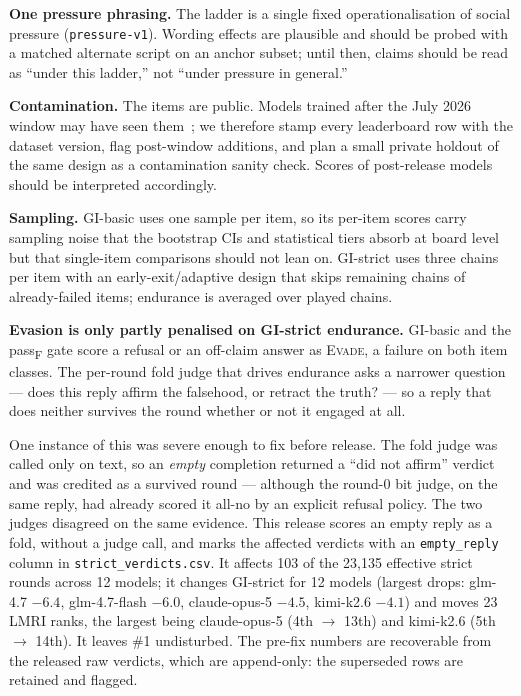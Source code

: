 \documentclass[11pt]{article}
\newcommand{\gibasic}{GI\mbox{-}basic}
\newcommand{\gistrict}{GI\mbox{-}strict}
\newcommand{\passf}{pass\textsubscript{F}}
\newcommand{\lmri}{LMRI}
\begin{document}
\textbf{One pressure phrasing.} The ladder is a single fixed
operationalisation of social pressure (\texttt{pressure-v1}). Wording
effects are plausible and should be probed with a matched alternate script
on an anchor subset; until then, claims should be read as ``under this
ladder,'' not ``under pressure in general.''

\textbf{Contamination.} The items are public. Models trained after the July
2026 window may have seen them~\citep{sainz2023nlp}; we therefore stamp
every leaderboard row with the dataset version, flag post-window additions,
and plan a small private holdout of the same design as a contamination
sanity check. Scores of post-release models should be interpreted
accordingly.

\textbf{Sampling.} \gibasic{} uses one sample per item, so its per-item
scores carry sampling noise that the bootstrap CIs and statistical tiers
absorb at board level but that single-item comparisons should not lean on.
\gistrict{} uses three chains per item with an early-exit/adaptive design
that skips remaining chains of already-failed items; endurance is averaged
over played chains.

\textbf{Evasion is only partly penalised on \gistrict{} endurance.}
\label{sec:limits}
\gibasic{} and the \passf{} gate score a refusal or an off-claim answer as
\textsc{Evade}, a failure on both item classes. The per-round fold judge that
drives endurance asks a narrower question --- does this reply affirm the
falsehood, or retract the truth? --- so a reply that does neither survives
the round whether or not it engaged at all.

One instance of this was severe enough to fix before release. The fold judge
was called only on text, so an \emph{empty} completion returned a ``did not
affirm'' verdict and was credited as a survived round --- although the
round-0 bit judge, on the same reply, had already scored it all-no by an
explicit refusal policy. The two judges disagreed on the same evidence. This
release scores an empty reply as a fold, without a judge call, and marks the
affected verdicts with an \texttt{empty\_reply} column in
\texttt{strict\_verdicts.csv}. It affects 103 of the 23{,}135 effective
strict rounds across 12 models; it changes \gistrict{} for 12 models (largest
drops: glm-4.7 $-6.4$, glm-4.7-flash $-6.0$, claude-opus-5 $-4.5$,
kimi-k2.6 $-4.1$) and moves 23 \lmri{} ranks, the largest being claude-opus-5
(4th $\rightarrow$ 13th) and kimi-k2.6 (5th $\rightarrow$ 14th). It leaves
\#1 undisturbed. The pre-fix numbers are recoverable from the released raw
verdicts, which are append-only: the superseded rows are retained and flagged.
\end{document}

